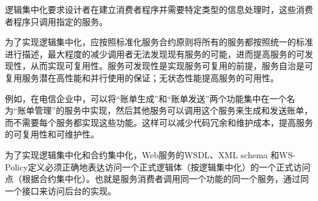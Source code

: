 \begin{solution}
逻辑集中化要求设计者在建立消费者程序并需要特定类型的信息处理时，这些消费者程序只调用指定的服务。

为了实现逻辑集中化，应按照标准化服务合约原则将所有的服务都按照统一的标准进行描述，最大程度的减少调用者无法发现现有服务的可能，进而提高服务的可发现性，从而实现可复用性。服务可发现性是实现服务可复用的前提，服务自治是可复用服务潜在高性能和并行使用的保证；无状态性能提高服务的可用性。

例如，在电信企业中，可以将“账单生成”和“账单发送”两个功能集中在一个名为“账单管理”的服务中实现，然后其他服务可以调用这个服务来生成和发送账单，而不需要每个服务都实现这些功能。这样可以减少代码冗余和维护成本，提高服务的可复用性和可维护性。


为了实现逻辑集中化和合约集中化，Web服务的WSDL、XML schema 和WS-Policy定义必须正确地表达访问一个正式逻辑体（按逻辑集中化）的一个正式访问点（根据合约集中化）。也就是服务消费者调用同一个功能的同一个服务，通过同一个接口来访问后台的实现。
\end{solution}